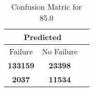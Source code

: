 \begin{table}[] 
\caption{Confusion Matric for 85.0} 
\label{Table: Prediction Accuracy-None85.0DecisionTrees100EKF-ignoreReflection-Reflection} 
\centering 
\begin{tabular} 
 {@{}ccc@{}} 
\toprule 
\multicolumn{2}{c}{\textbf{Predicted}}
 \\ \midrule 
\multicolumn{1}{|c|}{Failure} & 
\multicolumn{1}{c|}{No Failure}
 \\ \midrule 
\multicolumn{1}{|c|}{\color{green}\textbf{133159}} & 
\multicolumn{1}{c|}{\color{green}\textbf{23398}}
 \\ \midrule 
\multicolumn{1}{|c|}{\color{red}\textbf{2037}} & 
\multicolumn{1}{c|}{\color{red}\textbf{11534}}
 \\ \bottomrule 
\end{tabular} 
\end{table} 
